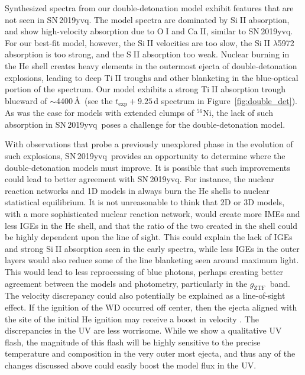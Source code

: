 \documentclass[twocolumn]{aastex63}
\def\ion#1#2{#1$\;${\footnotesize\rm{#2}}\relax}
\newcommand{\gztf}{$g_\mathrm{ZTF}$}
\newcommand{\radni}{$^{56}$Ni}
\newcommand{\sn}{SN\,2019yvq}
\begin{document}
Synthesized spectra from our double-detonation model exhibit features that are
not seen in \sn. The model spectra are dominated by \ion{Si}{II} absorption,
and show high-velocity absorption due to \ion{O}{I} and \ion{Ca}{II}, similar
to \sn. For our best-fit model, however, the \ion{Si}{II} velocities are too
slow, the \ion{Si}{II} $\lambda$5972 absorption is too strong, and the
\ion{S}{II} absorption too weak. Nuclear burning in the He shell creates heavy
elements in the outermost ejecta of double-detonation explosions, leading to
deep \ion{Ti}{II} troughs and other blanketing in the blue-optical portion of
the spectrum. Our model exhibits a strong \ion{Ti}{II} absorption trough
blueward of $\sim$4400\,\AA\ (see the $t_\mathrm{exp} + 9.25$\,d spectrum in
Figure~\ref{fig:double_det}). As was the case for models with extended clumps
of \radni, the lack of such absorption in \sn\ poses a challenge for the
double-detonation model.

With observations that probe a previously unexplored phase in the evolution of
such explosions, \sn\ provides an opportunity to determine where the
double-detonation models must improve. It is possible that such improvements
could lead to better agreement with \sn. For instance, the nuclear reaction
networks and 1D models in \citet{Polin19} always burn the He shells to nuclear
statistical equilibrium. It is not unreasonable to think that 2D or 3D models,
with a more sophisticated nuclear reaction network, would create more IMEs and
less IGEs in the He shell, and that the ratio of the two created in the shell
could be highly dependent upon the line of sight. 
This could explain the lack of IGEs and strong \ion{Si}{II} absorption seen in
the early spectra, while less IGEs in the outer layers would also reduce some
of the line blanketing seen around maximum light. This would lead to less
reprocessing of blue photons, perhaps creating better agreement between the
models and photometry, particularly in the \gztf\ band. The velocity
discrepancy could also potentially be explained as a line-of-sight effect. If
the ignition of the WD occurred off center, then the ejecta aligned with the
site of the initial He ignition may receive a boost in velocity
\citep[e.g.,][]{Kromer10}. The discrepancies in the UV are less worrisome.
While we show a qualitative UV flash, the magnitude of this flash will be
highly sensitive to the precise temperature and composition in the very outer
most ejecta, and thus any of the changes discussed above could easily boost
the model flux in the UV.
\end{document}

